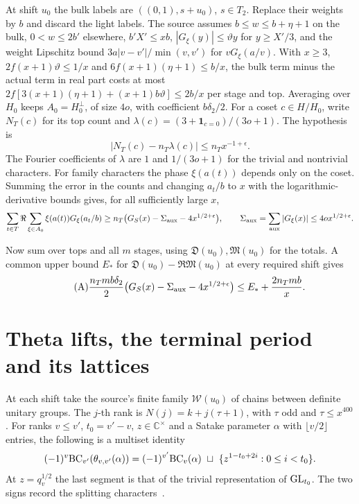 \documentclass[letterpaper,11pt]{article}
\newcommand{\Dsum}{\mathfrak D}
\newcommand{\Msum}{\mathfrak M}
\begin{document}
At shift \(u_0\) the bulk labels are \(((0,1),s+u_0)\), \(s\in T_2\). Replace their weights by \(b\) and discard the light labels. The source assumes \(b\le w\le b+\eta+1\) on the bulk, \(0<w\le2b'\) elsewhere, \(b'X'\le xb\), \(|G_\xi(y)|\le\vartheta y\) for \(y\ge X'/3\), and the weight Lipschitz bound \(3a|v-v'|/\min(v,v')\) for \(vG_\xi(a/v)\). With \(x\ge3\), \(2f(x+1)\vartheta\le1/x\) and \(6f(x+1)(\eta+1)\le b/x\), the bulk term minus the actual term in real part costs at most
\(2f[3(x+1)(\eta+1)+(x+1)b\vartheta]\le2b/x\) per stage and top. Averaging over \(H_0\) keeps \(A_0=H_0^\perp\), of size \(4o\), with coefficient \(b\delta_2/2\). For a coset \(c\in H/H_0\), write \(N_T(c)\) for its top count and \(\lambda(c)=(3+\mathbf1_{c=0})/(3o+1)\). The hypothesis is
\[
           |N_T(c)-n_T\lambda(c)|\le n_Tx^{-1+\epsilon}.
\]
The Fourier coefficients of \(\lambda\) are \(1\) and \(1/(3o+1)\) for the trivial and nontrivial characters. For family characters the phase \(\xi(a(t))\) depends only on the coset. Summing the error in the counts and changing \(a_t/b\) to \(x\) with the logarithmic-derivative bounds gives, for all sufficiently large \(x\),
\[
 \sum_{t\in T}\Re\sum_{\xi\in A_0}\xi(a(t))G_\xi(a_t/b)
 \ge n_T\bigl(G_S(x)-\Sigma_{\rm aux}-4x^{1/2+\epsilon}\bigr),
 \qquad \Sigma_{\rm aux}=\sum_{\rm aux}|G_\xi(x)|\le4o x^{1/2+\epsilon}.
\]

Now sum over tops and all \(m\) stages, using \(\Dsum(u_0),\Msum(u_0)\) for the totals. A common upper bound \(E_*\) for \(\Dsum(u_0)-\Re\Msum(u_0)\) at every required shift gives
\begin{equation}\tag{A}\label{eq:A}
 \frac{n_Tmb\delta_2}{2}\bigl(G_S(x)-\Sigma_{\rm aux}-4x^{1/2+\epsilon}\bigr)
 \le E_*+\frac{2n_Tmb}{x}.
\end{equation}
\section{Theta lifts, the terminal period and its lattices}\label{sec:theta}
At each shift take the source's finite family \(\mathcal W(u_0)\) of chains between definite unitary groups. The \(j\)-th rank is \(N(j)=k+j(\tau+1)\), with \(\tau\) odd and \(\tau\le x^{400}\). For ranks \(v\le v'\), \(t_0=v'-v\), \(z\in\mathbb C^\times\) and a Satake parameter \(\alpha\) with \(\lfloor v/2\rfloor\) entries, the following is a multiset identity
\[
 (-1)^v{\rm BC}_{v'}(\theta_{v,v'}(\alpha))
 =(-1)^{v'}{\rm BC}_{v}(\alpha)\ \sqcup\
 \{z^{1-t_0+2i}:0\le i<t_0\}.
\]
At \(z=q_v^{1/2}\) the last segment is that of the trivial representation of \({\rm GL}_{t_0}\). The two signs record the splitting characters~\cite{rallis2,hks}.
\end{document}
